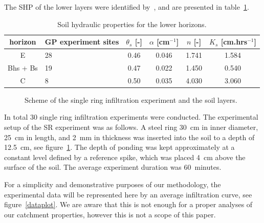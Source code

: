 \documentclass[review,times,3p,10pt]{elsarticle}
\newcommand{\fs}{\footnotesize}
\begin{document}
{{The SHP of the lower layers were identified by~\cite{Jacka1}, and are presented in table~\ref{tab_SHP}. }






 




\begin{table}[ht]
\begin{center}
\caption{Soil hydraulic properties for the lower horizons.}
\fs
\begin{tabular}{c | p{2cm} | c c c c }
\toprule
horizon &  GP experiment sites  & $\theta_s$ [-] & $\alpha$ [cm$^{-1}$]& $n$ [-]& $K_s$ [cm.hrs$^{-1}$]  \\ \hline
E & 28 &  0.46 & 0.046 & 1.741 & 1.584 \\
Bhs + Bs & 19  &0.47&  0.022 & 1.450 & 0.540 \\
C & 8 & 0.50 & 0.035 & 4.030 &  3.060  \\
\toprule
\end{tabular}
\label{tab_SHP}
\end{center}
\end{table}




 


 \begin{figure}
\centering
{}
 \caption{Scheme of the single ring infiltration experiment and the soil layers. }
 \label{experiment}
\end{figure}


In total 30 single ring infiltration experiments were conducted.
The experimental setup of the SR experiment was as follows. A steel ring 30~cm in inner diameter, 25~cm in length, and 2~mm in thickness was inserted into the soil to a depth of 12.5~cm, see figure~\ref{experiment}. The depth of ponding was kept approximately at a constant level defined by a reference spike, which was placed 4~cm above the surface of the soil. The average experiment duration was 60~minutes.


 {For a simplicity and demonstrative purposes of our methodology,  the experimental data will be represented here by an average infiltration curve, see figure~\ref{dataplot}. We are aware that this is not enough for a proper analyses of our catchment properties, however this is not a scope of this paper.
}

}
\end{document}
